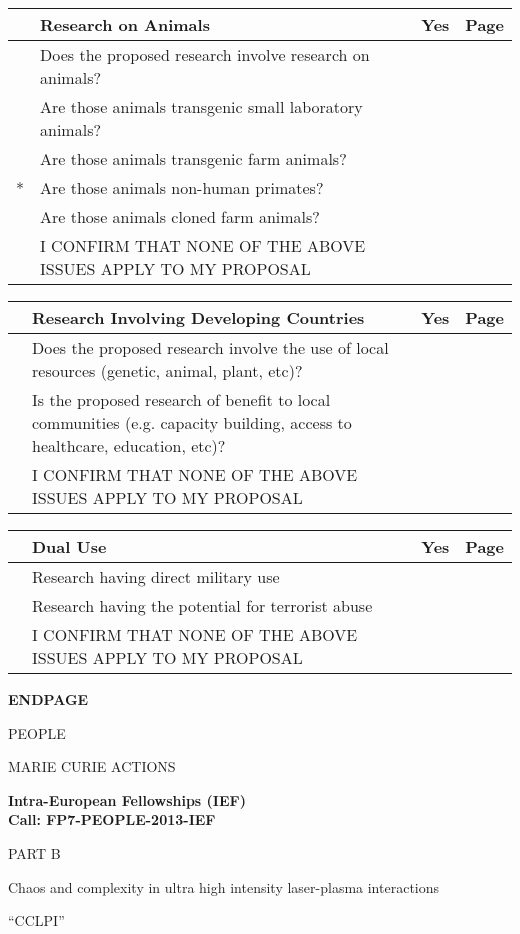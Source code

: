 \documentclass[a4paper,11pt]{article}
\newcommand{\projectname}[0]{CCLPI}
\newcommand{\mytitle}{Chaos and complexity in ultra high intensity laser-plasma interactions}
\newcommand{\cover}[1]{%
\newpage
\begin{center}
\vspace{4cm}
\textbf{#1}
\vspace{4cm}

PEOPLE

MARIE CURIE ACTIONS

\vspace{1cm}

\textbf{Intra-European Fellowships (IEF)}\\
\textbf{Call: FP7-PEOPLE-2013-IEF}

\vspace{4cm}

\Large{PART B}
\vspace{2cm}

\Huge{\mytitle}

\vspace{1cm}

\Large{``\projectname''}

\end{center}
\newpage
}
\begin{document}
\vspace{0.5cm}
\begin{tabularx}{\linewidth}{ | c | X | c | c | }
\rowcolor{black} & {\centering\arraybackslash \color{white} \bf Research on Animals} & {\color{white} \bf Yes} & {\color{white} \bf Page} \\ \hline
   & Does the proposed research involve research on animals?      & & \\ \hline
   & Are those animals transgenic small laboratory animals?       & & \\ \hline
   & Are those animals transgenic farm animals?                   & & \\ \hline
 * & Are those animals non-human primates?                        & & \\ \hline
   & Are those animals cloned farm animals?                       & & \\ \hline
   & I CONFIRM THAT NONE OF THE ABOVE ISSUES APPLY TO MY PROPOSAL & & \cellcolor[gray]{0.8}\\ \hline
\end{tabularx}

\vspace{0.5cm}
\begin{tabularx}{\linewidth}{ | c | X | c | c | }
\rowcolor{black} & {\centering\arraybackslash \color{white} \bf Research Involving Developing Countries} & {\color{white} \bf Yes} & {\color{white} \bf Page} \\ \hline
   & Does the proposed research involve the use of local resources (genetic, animal, plant, etc)?                             & & \\ \hline
   & Is the proposed research of benefit to local communities (e.g. capacity building, access to healthcare, education, etc)? & & \\ \hline
   & I CONFIRM THAT NONE OF THE ABOVE ISSUES APPLY TO MY PROPOSAL                                                             & & \cellcolor[gray]{0.8}\\ \hline
\end{tabularx}

\vspace{0.5cm}
\begin{tabularx}{\linewidth}{ | c | X | c | c | }
\rowcolor{black} & {\centering\arraybackslash \color{white} \bf Dual Use} & {\color{white} \bf Yes} & {\color{white} \bf Page} \\ \hline
   & Research having direct military use                          & & \\ \hline
   & Research having the potential for terrorist abuse            & & \\ \hline
   & I CONFIRM THAT NONE OF THE ABOVE ISSUES APPLY TO MY PROPOSAL & & \cellcolor[gray]{0.8}\\ \hline
\end{tabularx}



\cover{ENDPAGE}
\end{document}
